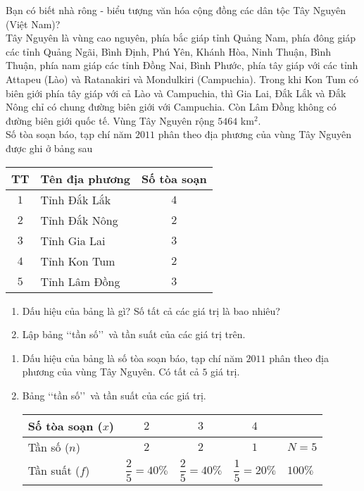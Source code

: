 \begin{bt}%
	Bạn có biết nhà rông - biểu tượng văn hóa cộng đồng các dân tộc Tây Nguyên (Việt Nam)?\\
	Tây Nguyên là vùng cao nguyên, phía bắc giáp tỉnh Quảng Nam, phía đông giáp các tỉnh Quảng Ngãi, Bình Định, Phú Yên, Khánh Hòa, Ninh Thuận, Bình Thuận, phía nam giáp các tỉnh Đồng Nai, Bình Phước, phía tây giáp với các tỉnh Attapeu (Lào) và Ratanakiri và Mondulkiri (Campuchia). Trong khi Kon Tum có biên giới phía tây giáp với cả Lào và Campuchia, thì Gia Lai, Đắk Lắk và Đắk Nông chỉ có chung đường biên giới với Campuchia. Còn Lâm Đồng không có đường biên giới quốc tế. Vùng Tây Nguyên rộng $5464$ km$^2$.\\
	Số tòa soạn báo, tạp chí năm $2011$ phân theo địa phương của vùng Tây Nguyên được ghi ở bảng sau
	\begin{center}
		\begin{tabular}{|c|l|c|}
			\hline
			TT &\multicolumn{1}{c|}{Tên địa phương} &Số tòa soạn\\
			\hline
			$1$ &Tỉnh Đắk Lắk &$4$\\
			\hline
			$2$ &Tỉnh Đắk Nông &$2$\\
			\hline
			$3$ &Tỉnh Gia Lai &$3$\\
			\hline
			$4$ &Tỉnh Kon Tum &$2$\\
			\hline
			$5$ &Tỉnh Lâm Đồng &$3$\\
			\hline
		\end{tabular}
	\end{center}
	\begin{enumerate}
		\item Dấu hiệu của bảng là gì? Số tất cả các giá trị là bao nhiêu?
		\item Lập bảng \lq\lq tần số\rq\rq\ và tần suất của các giá trị trên.
	\end{enumerate}
	\loigiai
	{
		\begin{enumerate}
			\item Dấu hiệu của bảng là số tòa soạn báo, tạp chí năm $2011$ phân theo địa phương của vùng Tây Nguyên. Có tất cả $5$ giá trị.
			\item Bảng \lq\lq tần số\rq\rq\ và tần suất của các giá trị.
			\begin{center}
				\begin{tabular}{|l|c|c|c|l|}
					\hline
					Số tòa soạn ($x$) &$2$ &$3$ &$4$ &\\
					\hline
					Tần số ($n$) &$2$ &$2$ &$1$ &$N=5$\\
					\hline
					Tần suất ($f$) &$\dfrac{2}{5}=40\%$ &$\dfrac{2}{5}=40\%$ &$\dfrac{1}{5}=20\%$ &$100\%$\\
					\hline
				\end{tabular}
			\end{center}
		\end{enumerate}
	}
\end{bt}
